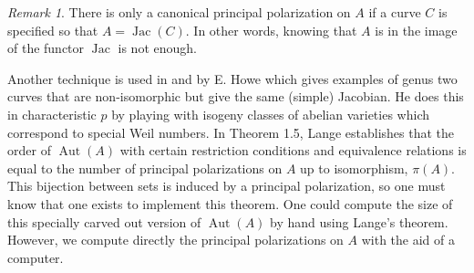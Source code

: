 \documentclass[12pt,reqno]{amsart}
\DeclareMathOperator{\Aut}{Aut}
\DeclareMathOperator{\Jac}{Jac}
\newcommand{\Q}{\mathbb{Q}}
\theoremstyle{definition}
\theoremstyle{remark}
\newtheorem*{remark}{Remark}
\begin{document}
\begin{remark} There is only a canonical principal polarization on $A$ if a curve $C$ is specified so that $A = \Jac(C).$ In other words, knowing that $A$ is in the image of the functor $\Jac$ is not enough. \end{remark}

Another technique is used in \cite{howe1} and \cite{howe2} by E. Howe which gives examples of genus two curves that are non-isomorphic but give the same (simple) Jacobian. He does this in characteristic $p$ by playing with isogeny classes of abelian varieties which correspond to special Weil numbers. In \cite{several} Theorem 1.5, Lange establishes that the order of $\Aut(A)$ with certain restriction conditions and equivalence relations is equal to the number of principal polarizations on $A$ up to isomorphism, $\pi(A)$. This bijection between sets is induced by a principal polarization, so one must know that one exists to implement this theorem. One could compute the size of this specially carved out version of $\Aut(A)$ by hand using Lange's theorem. However, we compute directly the principal polarizations on $A$ with the aid of a computer.




\end{document}
